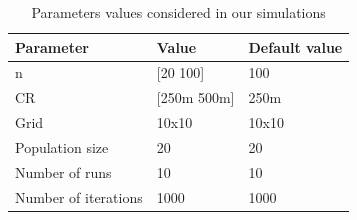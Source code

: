 \begin{table}[h]
\begin{center}
\caption{Parameters values considered in our simulations}%
\label{parametershybrid}
\begin{tabular}{p{5cm} p{5cm} p{5cm}}
\hline
\textbf{Parameter}& \textbf{Value} & \textbf{Default value} \\\hline
n&[20 100]&100\\ 
CR&[250m 500m]&250m\\ 
Grid&10x10&10x10\\
Population size&20&20\\
Number of runs&10&10\\
Number of iterations&1000&1000\\ \hline
\end{tabular}
\end{center}
\end{table}